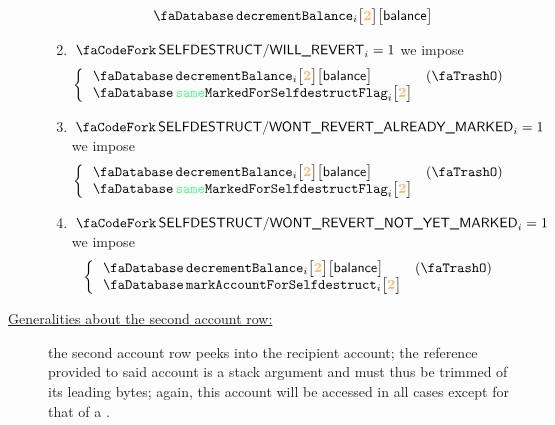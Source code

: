 \begin{description}
\begin{enumerate}
				\[
					\accDecrementBalance {i}{\locFirstAccountRow}{\locBalance}
				\]
			\item \If $\scenSelfdestructWillRevert _{i} = 1$ \Then we impose
				\[
					\left\{ \begin{array}{lr}
						\accDecrementBalance                {i}{\locFirstAccountRow}{\locBalance} & (\trash) \\
						\accSameMarkedForSelfdestructFlag   {i}{\locFirstAccountRow} \\
					\end{array} \right.
				\]
			\item \If $\scenSelfdestructWontRevertAlreadyMarked _{i} = 1$ \Then we impose
				\[
					\left\{ \begin{array}{lr}
						\accDecrementBalance                {i}{\locFirstAccountRow}{\locBalance} & (\trash) \\
						\accSameMarkedForSelfdestructFlag   {i}{\locFirstAccountRow} \\
					\end{array} \right.
				\]
			\item \If $\scenSelfdestructWontRevertNotYetMarked _{i} = 1$ \Then we impose
				\[
					\left\{ \begin{array}{lr}
						\accDecrementBalance                {i}{\locFirstAccountRow}{\locBalance} & (\trash) \\
						\accTurnOnMarkedForSelfdestructFlag {i}{\locFirstAccountRow} \\
					\end{array} \right.
				\]
		\end{enumerate}
	\item[\underline{Generalities about the second account row:}]
		the second account row peeks into the recipient account;
		the reference provided to said account is a stack argument and must thus be trimmed of its leading bytes;
		again, this account will be accessed in all cases except for that of a \staticxSH{}.


\end{description}
